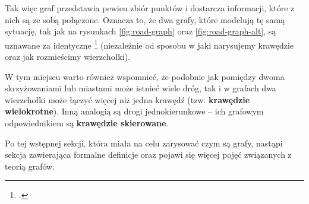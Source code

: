 Tak więc graf przedstawia pewien zbiór punktów i dostarcza informacji, które z nich są ze sobą połączone. Oznacza to, że dwa grafy, które modelują tę samą sytuację, tak jak na rysunkach \ref{fig:road-graph} oraz \ref{fig:road-graph-alt}, są uznawane za identyczne \footcite[12]{wilson} (niezależnie od sposobu w jaki narysujemy krawędzie oraz jak rozmieścimy wierzchołki). 

W tym miejscu warto również wspomnieć, że podobnie jak pomiędzy dwoma skrzyżowaniami lub miastami może istnieć wiele dróg, tak i w grafach dwa wierzchołki może łączyć więcej niż jedna krawędź (tzw. \textbf{krawędzie wielokrotne}). Inną analogią są drogi jednokierunkowe -- ich grafowym odpowiednikiem są \textbf{krawędzie skierowane}. 

Po tej wstępnej sekcji, która miała na celu zarysować czym są grafy, nastąpi sekcja zawierająca formalne definicje oraz pojawi się więcej pojęć związanych z teorią grafów. 